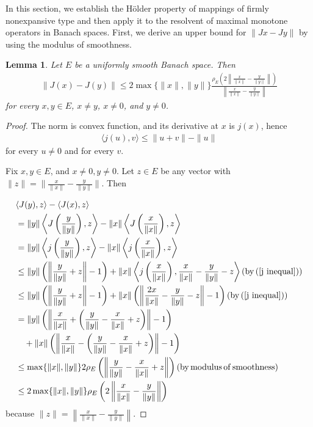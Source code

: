 \documentclass[12pt,a4paper]{amsart}
\newtheorem{lemma}[theorem]{Lemma}
\theoremstyle{definition}
\numberwithin{equation}{section}
\begin{document}
In this section, we establish the H\"{o}lder property of mappings of firmly nonexpansive type and then apply it to the resolvent of maximal monotone operators in Banach spaces. First, we derive an upper bound for \( \|Jx - Jy\| \) by using the modulus of smoothness.
\begin{lemma}\label{keylem 1}
  Let $E$ be a uniformly smooth Banach space. Then
  \begin{align}
    \| J(x) - J(y) \| \leq 2\max\{ \| x \|, \| y \| \}  \frac{\rho_E \left( 2 \left\| \frac{x}{\| x \|} - \frac{y}{\| y \|} \right\| \right)}{\left\| \frac{x}{\| x \|} - \frac{y}{\| y \|} \right\|}
  \end{align}
for every $x,y\in E$, $x \neq y$, $x \neq 0$, and $y \neq 0$.
\end{lemma}
\begin{proof}
The norm is convex function, and its derivative at \( x \) is \( j(x) \), hence
\begin{align}\label{j inequal}
\langle j(u), v \rangle \leq \| u + v \| - \| u \|
\end{align}
for every \( u \neq 0 \) and for every \( v \).

Fix $x,y \in E$, and $x \neq 0, y \neq 0$. Let $z\in E$ be any vector with $\|z\| = \big\| \frac{x}{\|x\|} - \frac{y}{\|y\|}\big\|$. Then

\[
\begin{aligned}
\allowdisplaybreaks
&\langle J(y), z \rangle - \langle J(x), z \rangle \\
&= \| y \| \left\langle J\left( \frac{y}{\| y \|} \right), z \right\rangle - \| x \| \left\langle J\left( \frac{x}{\| x \|} \right), z \right\rangle \\
&= \| y \| \left\langle j\left( \frac{y}{\| y \|} \right), z \right\rangle - \| x \| \left\langle j\left( \frac{x}{\| x \|} \right), z \right\rangle \\
&\leq \| y \| \left( \left\| \frac{y}{\| y \|} + z \right\| - 1 \right) + \| x \| \left\langle j\left( \frac{x}{\| x \|} \right), \frac{x}{\| x \|} - \frac{y}{\| y \|} - z \right\rangle (\mathrm{by}\, (\ref{j inequal}))\\
&\leq \| y \| \left( \left\| \frac{y}{\| y \|} + z \right\| - 1 \right) + \| x \| \left( \left\| \frac{2x}{\| x \|} - \frac{y}{\| y \|} - z \right\| - 1 \right) (\mathrm{by}\, (\ref{j inequal}))\\
&= \| y \| \left( \left\| \frac{x}{\| x \|} + \left( \frac{y}{\| y \|} - \frac{x}{\| x \|} + z \right) \right\| - 1 \right) \\
&\quad + \| x \| \left( \left\| \frac{x}{\| x \|} - \left( \frac{y}{\| y \|} - \frac{x}{\| x \|} + z \right) \right\| - 1 \right) \\
&\leq \max\{ \| x \|, \| y \| \} 2\rho_E \left( \left\| \frac{y}{\| y \|} - \frac{x}{\| x \|} + z \right\| \right) (\mathrm{by\, modulus\, of\, smoothness} )\\
&\leq 2\max\{ \| x \|, \| y \| \} \rho_E \left( 2 \left\| \frac{x}{\| x \|} - \frac{y}{\| y \|} \right\| \right)
\end{aligned}
\]
because \( \| z \| = \left\| \frac{x}{\| x \|} - \frac{y}{\| y \|} \right\| \).


\end{proof}
\end{document}
